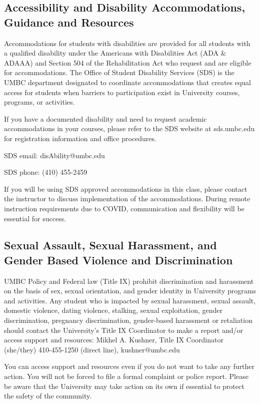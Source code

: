 \documentclass[11pt]{article}
\begin{document}
\subsection*{Accessibility and Disability Accommodations, Guidance and Resources }

Accommodations for students with disabilities are provided for all students with a qualified disability under the Americans with Disabilities Act (ADA \& ADAAA) and Section 504 of the Rehabilitation Act who request and are eligible for accommodations. The Office of Student Disability Services (SDS) is the UMBC department designated to coordinate accommodations that creates equal access for students when barriers to participation exist in University courses, programs, or activities.

If you have a documented disability and need to request academic accommodations in your courses, please refer to the SDS website at sds.umbc.edu for registration information and office procedures.

SDS email: disAbility@umbc.edu

SDS phone: (410) 455-2459

If you will be using SDS approved accommodations in this class, please contact the instructor to discuss implementation of the accommodations. During remote instruction requirements due to COVID, communication and flexibility will be essential for success.

\subsection*{Sexual Assault, Sexual Harassment, and Gender Based Violence and Discrimination}
UMBC Policy and Federal law (Title IX) prohibit discrimination and harassment on the basis of sex, sexual orientation, and gender identity in University programs and activities. Any student who is impacted by sexual harassment, sexual assault, domestic violence, dating violence, stalking, sexual exploitation, gender discrimination, pregnancy discrimination, gender-based harassment or retaliation should contact the University’s Title IX Coordinator to make a report and/or access support and resources:
Mikhel A. Kushner, Title IX Coordinator (she/they) 410-455-1250 (direct line), kushner@umbc.edu

You can access support and resources even if you do not want to take any further action. You will not be forced to file a formal complaint or police report. Please be aware that the University may take action on its own if essential to protect the safety of the community.
\end{document}
